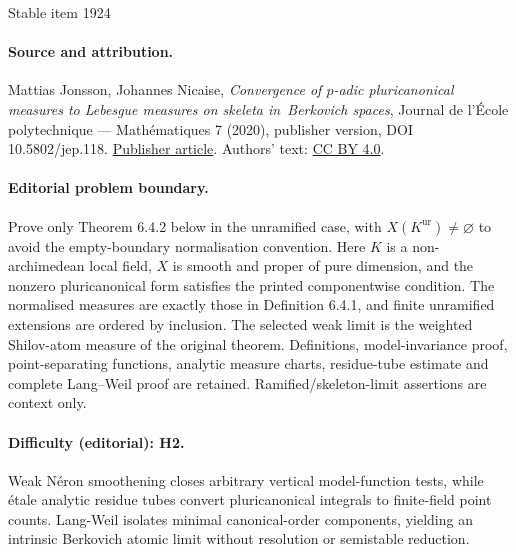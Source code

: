 \documentclass[11pt]{article}
\begin{document}
\begin{center}{\Large Stable item 1924}\end{center}
\paragraph{Source and attribution.}
Mattias Jonsson, Johannes Nicaise, \emph{Convergence of $p$-adic pluricanonical measures to Lebesgue measures on skeleta in Berkovich spaces}, Journal de l’École polytechnique — Mathématiques 7 (2020), publisher version, DOI 10.5802/jep.118. \href{https://jep.centre-mersenne.org/articles/10.5802/jep.118/}{Publisher article}. Authors' text: \href{https://creativecommons.org/licenses/by/4.0/}{CC BY 4.0}.
\paragraph{Editorial problem boundary.}
Prove only Theorem 6.4.2 below in the unramified case, with \(X(K^{\mathrm{ur}})\ne\varnothing\) to avoid the empty-boundary normalisation convention. Here \(K\) is a non-archimedean local field, \(X\) is smooth and proper of pure dimension, and the nonzero pluricanonical form satisfies the printed componentwise condition. The normalised measures are exactly those in Definition 6.4.1, and finite unramified extensions are ordered by inclusion. The selected weak limit is the weighted Shilov-atom measure of the original theorem. Definitions, model-invariance proof, point-separating functions, analytic measure charts, residue-tube estimate and complete Lang--Weil proof are retained. Ramified/skeleton-limit assertions are context only.
\paragraph{Difficulty (editorial): H2.}
Weak Néron smoothening closes arbitrary vertical model-function tests, while étale analytic residue tubes convert pluricanonical integrals to finite-field point counts. Lang-Weil isolates minimal canonical-order components, yielding an intrinsic Berkovich atomic limit without resolution or semistable reduction.
\end{document}
